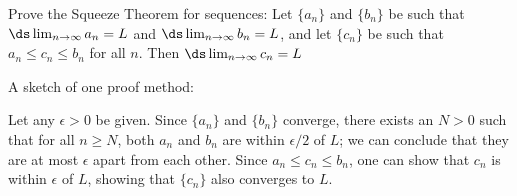 {Prove the Squeeze Theorem for sequences: Let $\{a_n\}$ and $\{b_n\}$  be such that $\ds\lim_{n\to\infty} a_n = L$ and $\ds\lim_{n\to\infty} b_n = L$, and let $\{c_n\}$ be such that $a_n\leq c_n\leq b_n$ for all $n$. Then $\ds\lim_{n\to\infty} c_n = L$  
}
{A sketch of one proof method: 

Let any $\epsilon>0$ be given. Since $\{a_n\}$ and $\{b_n\}$ converge, there exists an $N>0$ such that for all $n\geq N$, both $a_n$ and $b_n$ are within $\epsilon/2$ of $L$; we can conclude that they are at most $\epsilon$ apart from each other. Since $a_n\leq c_n \leq b_n$, one can show that $c_n$ is within $\epsilon$ of $L$, showing that $\{c_n\}$ also converges to $L$.
}
